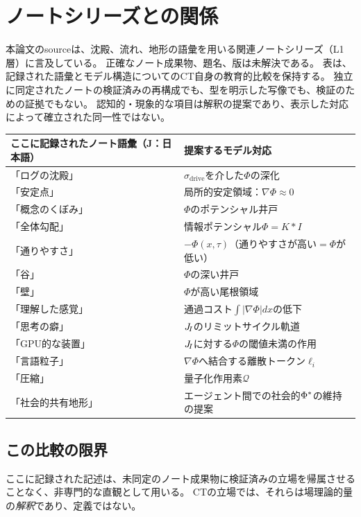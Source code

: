 \section{ノートシリーズとの関係}
\label{sec:note}

本論文のsourceは、沈殿、流れ、地形の語彙を用いる関連ノートシリーズ（L1層）に言及している。
正確なノート成果物、題名、版は未解決である。
表は、記録された語彙とモデル構造についてのCT自身の教育的比較を保持する。
独立に同定されたノートの検証済みの再構成でも、型を明示した写像でも、検証のための証拠でもない。
認知的・現象的な項目は解釈の提案であり、表示した対応によって確立された同一性ではない。

\begin{center}
\renewcommand{\arraystretch}{1.5}
\begin{tabular}{p{}p{}}
\toprule
\textbf{ここに記録されたノート語彙（J：日本語）} &
\textbf{提案するモデル対応} \\
\midrule
「ログの沈殿」 & $\sigma_{\mathrm{drive}}$を介した$\Phi$の深化 \\
「安定点」 & 局所的安定領域：$\nabla\Phi\approx 0$ \\
「概念のくぼみ」 & $\Phi$のポテンシャル井戸 \\
「全体勾配」 & 情報ポテンシャル$\Phi = K*I$ \\
「通りやすさ」 & $-\Phi(x,\tau)$（通りやすさが高い$=$$\Phi$が低い） \\
「谷」 & $\Phi$の深い井戸 \\
「壁」 & $\Phi$が高い尾根領域 \\
「理解した感覚」 & 通過コスト$\int|\nabla\Phi|dx$の低下 \\
「思考の癖」 & $J_{\!I}$のリミットサイクル軌道 \\
「GPU的な装置」 & $J_{\!I}$に対する$\Phi$の閾値未満の作用 \\
「言語粒子」 & $\nabla\Phi$へ結合する離散トークン$\ell_i$ \\
「圧縮」 & 量子化作用素$\mathcal{Q}$ \\
「社会的共有地形」 & エージェント間での社会的$\Phi^{*}$の維持の提案 \\
\bottomrule
\end{tabular}
\end{center}

\subsection{この比較の限界}
ここに記録された記述は、未同定のノート成果物に検証済みの立場を帰属させることなく、非専門的な直観として用いる。
CTの立場では、それらは場理論的量の\emph{解釈}であり、定義ではない。

